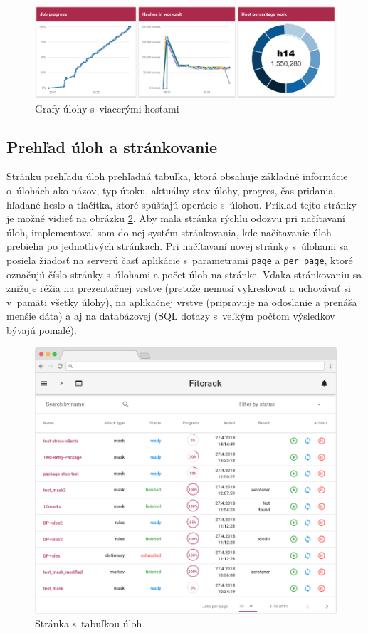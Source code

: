\documentclass[slovak]{fitthesis}
\begin{document}
\begin{figure}[H]
    \centering
    \includegraphics[scale=0.56]{obrazky/graf2.PNG}
    \caption{Grafy úlohy s~viacerými hosťami}
    \label{fig:graf2}
\end{figure}

\subsection{Prehľad úloh a stránkovanie}
Stránku prehľadu úloh prehľadná tabuľka, ktorá obsahuje základné informácie o~úlohách ako názov, typ útoku, aktuálny stav úlohy, progres, čas pridania, hľadané heslo a tlačítka, ktoré spúšťajú operácie s~úlohou. Príklad tejto stránky je možné vidieť na obrázku \ref{fig:jobsPage}. Aby mala stránka rýchlu odozvu pri načítavaní úloh, implementoval som do nej systém stránkovania, kde načítavanie úloh prebieha po jednotlivých stránkach. Pri načítavaní novej stránky s~úlohami sa posiela žiadosť na serverú časť aplikácie s~parametrami \texttt{page} a \texttt{per\_page}, ktoré označujú číslo stránky s~úlohami a počet úloh na stránke. Vďaka stránkovaniu sa znižuje réžia na prezentačnej vrstve (pretože nemusí vykreslovať a uchovávať si v~pamäti všetky úlohy), na aplikačnej vrstve (pripravuje na odoslanie a prenáša menšie dáta) a aj na databázovej (SQL dotazy s~veľkým počtom výsledkov bývajú pomalé).
\begin{figure}[H]
    \centering
    \includegraphics[scale=0.46]{obrazky/jobsFrame2.PNG}
    \caption{Stránka s~tabuľkou úloh}
    \label{fig:jobsPage}
\end{figure}
\end{document}
